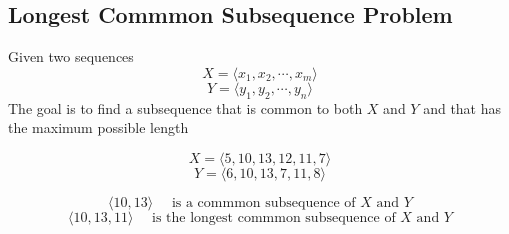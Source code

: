 \documentclass[11pt]{article}
\begin{document}
\subsection*{Longest Commmon Subsequence Problem}

Given two sequences
\[
  X = \langle x_1, x_2, \cdots, x_m \rangle
\]
\[
  Y = \langle y_1, y_2, \cdots, y_n \rangle
\]
The goal is to find a subsequence that is common to both $X$ and $Y$ and that has the maximum possible length

\begin{example}
  \[
    X = \langle 5, 10, 13, 12, 11, 7 \rangle
  \]
  \[
    Y = \langle 6, 10, 13, 7, 11, 8 \rangle
  \]

  \[
    \langle 10, 13 \rangle \quad \text{ is a commmon subsequence of $X$ and $Y$}
  \]
  \[
    \langle 10, 13, 11 \rangle \quad \text{ is the longest commmon subsequence of $X$ and $Y$}
  \]
\end{example}
\end{document}
